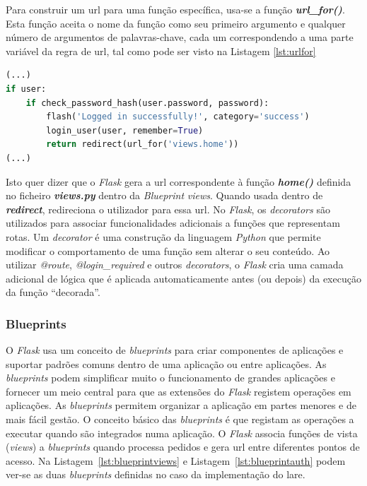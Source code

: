 Para construir um \acrshort{url} para uma função específica, usa-se a função \textit{\textbf{url\_for()}}. Esta função aceita o nome da função como seu primeiro argumento e qualquer número de argumentos de palavras-chave, cada um correspondendo a uma parte variável da regra de \acrshort{url}, tal como pode ser visto na Listagem \ref{lst:urlfor}

\begin{minipage}{0.9\linewidth}
	\begin{lstlisting}[language=Python, caption=Contrução de \textit{url}s - \textit{auth.py}, label=lst:urlfor]
(...)
if user:
    if check_password_hash(user.password, password):
        flash('Logged in successfully!', category='success')
        login_user(user, remember=True)
        return redirect(url_for('views.home'))
(...)
\end{lstlisting}
\end{minipage}

Isto quer dizer que o \textit{Flask} gera a \acrshort{url} correspondente à função \textit{\textbf{home()}} definida no ficheiro \textit{\textbf{views.py}} dentro da \textit{Blueprint} \textit{views}. Quando usada dentro de \textit{\textbf{redirect}}, redireciona o utilizador para essa \acrshort{url}. No \textit{Flask}, os \textit{decorators} são utilizados para associar funcionalidades adicionais a funções que representam rotas. Um \textit{decorator} é uma construção da linguagem \textit{Python} que permite modificar o comportamento de uma função sem alterar o seu conteúdo. Ao utilizar \textit{@route}, \textit{@login\_required} e outros \textit{decorators}, o \textit{Flask} cria uma camada adicional de lógica que é aplicada automaticamente antes (ou depois) da execução da função ``decorada''.

\subsubsection{Blueprints}
O \textit{Flask} usa um conceito de \textit{blueprints} para criar componentes de aplicações e suportar padrões comuns dentro de uma aplicação ou entre aplicações. As \textit{blueprints} podem simplificar muito o funcionamento de grandes aplicações e fornecer um meio central para que as extensões do \textit{Flask} registem operações em aplicações. As \textit{blueprints} permitem organizar a aplicação em partes menores e de mais fácil gestão. O conceito básico das \textit{blueprints} é que registam as operações a executar quando são integrados numa aplicação. O \textit{Flask} associa funções de vista (\textit{views}) a \textit{blueprints} quando processa pedidos e gera \acrshort{url} entre diferentes pontos de acesso. Na Listagem~\ref{lst:blueprintviews} e Listagem~\ref{lst:blueprintauth} podem ver-se as duas \textit{blueprints} definidas no caso da implementação do \acrshort{lare}.


